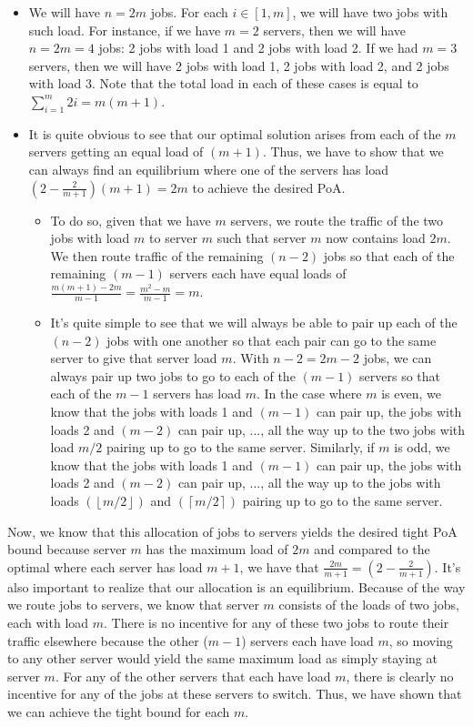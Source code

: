 \documentclass[12 pt]{article}
\begin{document}
	\begin{itemize}
		\item We will have $n = 2m$ jobs. For each $i \in [1, m]$, we will have two jobs with such load. For instance, if we have $m = 2$ servers, then we will have $n = 2m = 4$ jobs: 2 jobs with load 1 and 2 jobs with load 2. If we had $m = 3$ servers, then we will have 2 jobs with load 1, 2 jobs with load 2, and 2 jobs with load 3. Note that the total load in each of these cases is equal to $\sum_{i=1}^m 2i = m(m+1)$. 
		\item It is quite obvious to see that our optimal solution arises from each of the $m$ servers getting an equal load of $(m+1)$. Thus, we have to show that we can always find an equilibrium where one of the servers has load $(2- \frac{2}{m+1}) (m+1) = 2m$ to achieve the desired PoA. 
		\begin{itemize}
			\item To do so, given that we have $m$ servers, we route the traffic of the two jobs with load $m$ to server $m$ such that server $m$ now contains load $2m$. We then route traffic of the remaining $(n-2)$ jobs so that each of the remaining $(m-1)$ servers each have equal loads of $\frac{m(m+1)-2m}{m-1} =  \frac{m^2 - m}{m-1} = m$. 
			\item It's quite simple to see that we will always be able to pair up each of the $(n-2)$ jobs with one another so that each pair can go to the same server to give that server load $m$. With $n-2 = 2m-2$ jobs, we can always pair up two jobs to go to each of the $(m-1)$ servers so that each of the $m-1$ servers has load $m$. In the case where $m$ is even, we know that the jobs with loads 1 and $(m-1)$ can pair up, the jobs with loads 2 and $(m-2)$ can pair up, ..., all the way up to the two jobs with load $m/2$ pairing up to go to the same server. Similarly, if $m$ is odd, we know that the jobs with loads 1 and $(m-1)$ can pair up, the jobs with loads 2 and $(m-2)$ can pair up, ..., all the way up to the jobs with loads $(\left \lfloor{m/2}\right \rfloor)$ and $(\left \lceil{m/2}\right \rceil)$ pairing up to go to the same server. 
		\end{itemize}
	\end{itemize}

	\noindent Now, we know that this allocation of jobs to servers yields the desired tight PoA bound because server $m$ has the maximum load of $2m$ and compared to the optimal where each server has load $m+1$, we have that $\frac{2m}{m+1} = (2- \frac{2}{m+1})$. It's also important to realize that our allocation is an equilibrium. Because of the way we route jobs to servers, we know that server $m$ consists of the loads of two jobs, each with load $m$. There is no incentive for any of these two jobs to route their traffic elsewhere because the other ($m-1$) servers each have load $m$, so moving to any other server would yield the same maximum load as simply staying at server $m$. For any of the other servers that each have load $m$, there is clearly no incentive for any of the jobs at these servers to switch. Thus, we have shown that we can achieve the tight bound for each $m$. \\
	
\end{document}
